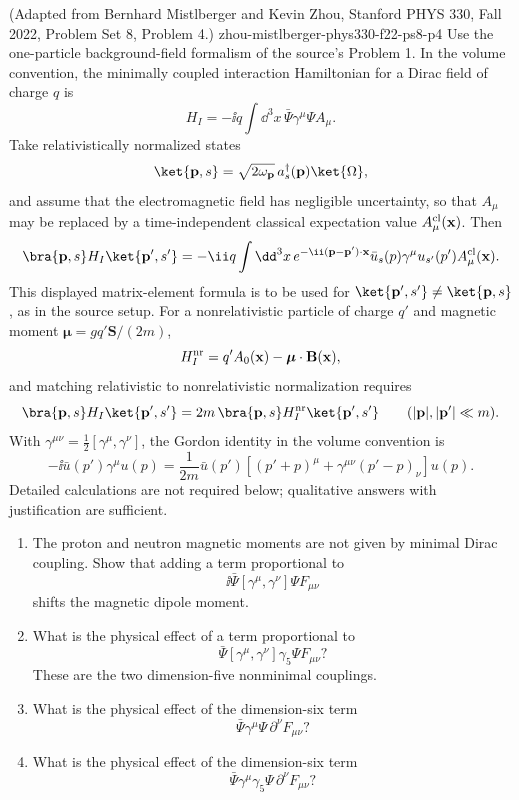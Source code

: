 \begin{enumerate}
  {(Adapted from Bernhard Mistlberger and Kevin Zhou, Stanford PHYS 330, Fall 2022, Problem Set 8, Problem 4.)}
  {zhou-mistlberger-phys330-f22-ps8-p4}
Use the one-particle background-field formalism of the source's Problem 1.
In the volume convention, the minimally coupled interaction Hamiltonian for
a Dirac field of charge \(q\) is
\[
 H_I=-\ii q\int \dd^3x\,\bar\Psi\gamma^\mu\Psi A_\mu .
\]
Take relativistically normalized states
\[
 \ket{\mathbf p,s}
 =\sqrt{2\omega_{\mathbf p}}\,a_s^\dagger(\mathbf p)\ket{\Omega},
\]
and assume that the electromagnetic field has negligible uncertainty, so
that \(A_\mu\) may be replaced by a time-independent classical expectation
value \(A_\mu^{\rm cl}(\mathbf x)\).  Then
\[
 \bra{\mathbf p,s}H_I\ket{\mathbf p',s'}
 =-\ii q\int \dd^3x\,
 e^{-\ii(\mathbf p-\mathbf p')\cdot\mathbf x}
 \bar u_s(p)\gamma^\mu u_{s'}(p')A_\mu^{\rm cl}(\mathbf x).
\]
This displayed matrix-element formula is to be used for
\(\ket{\mathbf p',s'}\ne\ket{\mathbf p,s}\), as in the source setup.
For a nonrelativistic particle of charge \(q'\) and magnetic moment
\(\boldsymbol\mu=gq'\mathbf S/(2m)\),
\[
 H_I^{\rm nr}=q'A_0(\mathbf x)-\boldsymbol\mu\cdot\mathbf B(\mathbf x),
\]
and matching relativistic to nonrelativistic normalization requires
\[
 \bra{\mathbf p,s}H_I\ket{\mathbf p',s'}
 =2m\,
 \bra{\mathbf p,s}H_I^{\rm nr}\ket{\mathbf p',s'}
 \qquad
 (|\mathbf p|,|\mathbf p'|\ll m).
\]
With
\(\gamma^{\mu\nu}=\frac12[\gamma^\mu,\gamma^\nu]\), the Gordon identity in
the volume convention is
\[
 -\ii\bar u(p')\gamma^\mu u(p)
 =\frac{1}{2m}\bar u(p')
 \left[(p'+p)^\mu+\gamma^{\mu\nu}(p'-p)_\nu\right]u(p).
\]
Detailed calculations are not required below; qualitative answers with
justification are sufficient.
\begin{enumerate}
\item
The proton and neutron magnetic moments are not given by minimal Dirac
coupling.  Show that adding a term proportional to
\[
 \ii\bar\Psi[\gamma^\mu,\gamma^\nu]\Psi F_{\mu\nu}
\]
shifts the magnetic dipole moment.
\item
What is the physical effect of a term proportional to
\[
 \bar\Psi[\gamma^\mu,\gamma^\nu]\gamma_5\Psi F_{\mu\nu}?
\]
These are the two dimension-five nonminimal couplings.
\item
What is the physical effect of the dimension-six term
\[
 \bar\Psi\gamma^\mu\Psi\,\partial^\nu F_{\mu\nu}?
\]
\item
What is the physical effect of the dimension-six term
\[
 \bar\Psi\gamma^\mu\gamma_5\Psi\,\partial^\nu F_{\mu\nu}?
\]
\end{enumerate}
\end{enumerate}
